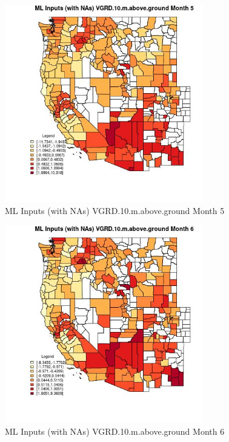 \begin{figure} 
\centering  
\includegraphics[width=0.77\textwidth]{Code_Outputs/Report_ML_input_PM25_Step4_part_e_de_duplicated_aves_compiled_2019-05-21wNAs_CountyVGRD10mabovegroundmedianMonth5.jpg} 
\caption{\label{fig:Report_ML_input_PM25_Step4_part_e_de_duplicated_aves_compiled_2019-05-21wNAsCountyVGRD10mabovegroundmedianMonth5}ML Inputs (with NAs) VGRD.10.m.above.ground Month 5} 
\end{figure} 
 

\begin{figure} 
\centering  
\includegraphics[width=0.77\textwidth]{Code_Outputs/Report_ML_input_PM25_Step4_part_e_de_duplicated_aves_compiled_2019-05-21wNAs_CountyVGRD10mabovegroundmedianMonth6.jpg} 
\caption{\label{fig:Report_ML_input_PM25_Step4_part_e_de_duplicated_aves_compiled_2019-05-21wNAsCountyVGRD10mabovegroundmedianMonth6}ML Inputs (with NAs) VGRD.10.m.above.ground Month 6} 
\end{figure} 
 

